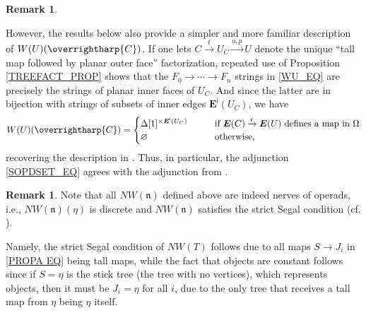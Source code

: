 \documentclass[a4paper,10pt
,draft
]{article}%
\numberwithin{equation}{section}
\numberwithin{figure}{section}
\theoremstyle{definition} %
\newtheorem{remark}[equation]{Remark}%
\newcommand{\vect}[1]{\text{\overrightharp{\ensuremath{#1}}}}
\newcommand{\1}{\ensuremath{\mathbbm 1}}%
\begin{document}
\begin{remark}
        \label{COMPWITHMW_REM}
        
	However, the results below also provide a simpler and more familiar description of $W(U)(\vect{C})$.
	If one lets
	$C \xrightarrow{t} U_C \xrightarrow{o,p} U$
	denote the unique ``tall map followed by planar outer face'' factorization, 
	repeated use of Proposition \ref{TREEFACT_PROP}
	shows that the 
	$F_0 \to \cdots \to F_n$
	strings in \eqref{WU_EQ}
	are precisely the strings of planar inner faces of $U_C$.
	And since the latter are in bijection with strings of subsets of inner edges $\boldsymbol{E}^{\mathsf{i}}(U_C)$, 
	we have 
        \begin{equation}\label{WU_EQ2}
                W(U)(\vect C) =
                \begin{cases}
                        \Delta[1]^{\times \boldsymbol{E}^{\mathsf{i}}(U_{C})}
                        \qquad
                        &
                        \mbox{if $\boldsymbol{E}(C) \xrightarrow{\mathfrak{c}} \boldsymbol{E}(U)$ defines a map in $\Omega$}
                        \\
                        \varnothing
                        &
                        \mbox{otherwise,}
                \end{cases}
        \end{equation}
        recovering the description in \cite[\S 4]{CM13b}.
        Thus, in particular, the adjunction \eqref{SOPDSET_EQ} agrees with the adjunction from \cite{CM13b}.
\end{remark}



\begin{remark}\label{NWTNS_REM}
	Note that all
	$NW(\mathfrak{n})$ defined above are indeed nerves of operads,
	i.e., 
	$NW(\mathfrak{n})(\eta)$ is discrete
	and
	$NW(\mathfrak{n})$ satisfies the strict Segal condition
	(cf. \cite[Cor 3.77]{BP_geo} ).
          
{\color{red}

Namely, the strict Segal condition of $NW(T)$ follows due to all maps
$S \to J_i$ in \eqref{PROPA EQ} being tall maps,
while the fact that objects are constant follows since if
$S = \eta$ is the stick tree (the tree with no vertices),
which represents objects, 
then it must be $J_i=\eta$ for all $i$,
due to the only tree that receives a tall map from $\eta$ being $\eta$ itself.
}
\end{remark}
\end{document}
